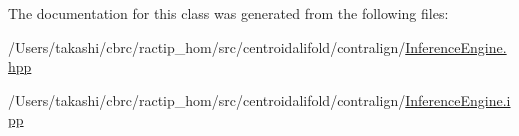 The documentation for this class was generated from the following files\+:\begin{DoxyCompactItemize}
\item 
/\+Users/takashi/cbrc/ractip\+\_\+hom/src/centroidalifold/contralign/\hyperlink{centroidalifold_2contralign_2_inference_engine_8hpp}{Inference\+Engine.\+hpp}\item 
/\+Users/takashi/cbrc/ractip\+\_\+hom/src/centroidalifold/contralign/\hyperlink{centroidalifold_2contralign_2_inference_engine_8ipp}{Inference\+Engine.\+ipp}\end{DoxyCompactItemize}
